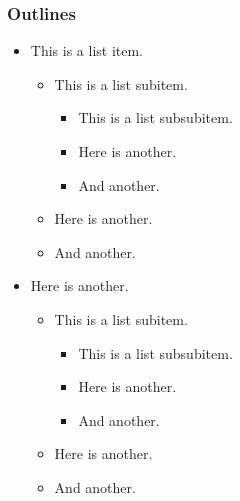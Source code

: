 \begin{frame}\frametitle{Outlines}

\begin{itemize}
    \item This is a list item.
    \begin{itemize}
        \item This is a list subitem.
        \begin{itemize}
            \item This is a list subsubitem.
            \item Here is another.
            \item And another.
        \end{itemize}
        \item Here is another.
        \item And another.
    \end{itemize}
    \item Here is another.
    \begin{itemize}
        \item This is a list subitem.
        \begin{itemize}
            \item This is a list subsubitem.
            \item Here is another.
            \item And another.
        \end{itemize}
        \item Here is another.
        \item And another.
    \end{itemize}
\end{itemize}

\end{frame}


